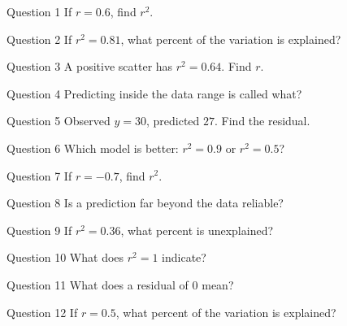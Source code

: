\documentclass[11pt]{article}
\begin{document}
\begin{qbox}{Question 1}
If $r=0.6$, find $r^{2}$.\workspace{2.4cm}
\end{qbox}

\begin{qbox}{Question 2}
If $r^{2}=0.81$, what percent of the variation is explained?\workspace{2.4cm}
\end{qbox}

\begin{qbox}{Question 3}
A positive scatter has $r^{2}=0.64$. Find $r$.\workspace{2.4cm}
\end{qbox}

\begin{qbox}{Question 4}
Predicting inside the data range is called what?\workspace{2.4cm}
\end{qbox}

\begin{qbox}{Question 5}
Observed $y=30$, predicted $27$. Find the residual.\workspace{2.4cm}
\end{qbox}

\begin{qbox}{Question 6}
Which model is better: $r^{2}=0.9$ or $r^{2}=0.5$?\workspace{2.4cm}
\end{qbox}

\begin{qbox}{Question 7}
If $r=-0.7$, find $r^{2}$.\workspace{2.4cm}
\end{qbox}

\begin{qbox}{Question 8}
Is a prediction far beyond the data reliable?\workspace{2.4cm}
\end{qbox}

\begin{qbox}{Question 9}
If $r^{2}=0.36$, what percent is unexplained?\workspace{2.4cm}
\end{qbox}

\begin{qbox}{Question 10}
What does $r^{2}=1$ indicate?\workspace{2.4cm}
\end{qbox}

\begin{qbox}{Question 11}
What does a residual of $0$ mean?\workspace{2.4cm}
\end{qbox}

\begin{qbox}{Question 12}
If $r=0.5$, what percent of the variation is explained?\workspace{2.4cm}
\end{qbox}
\end{document}
